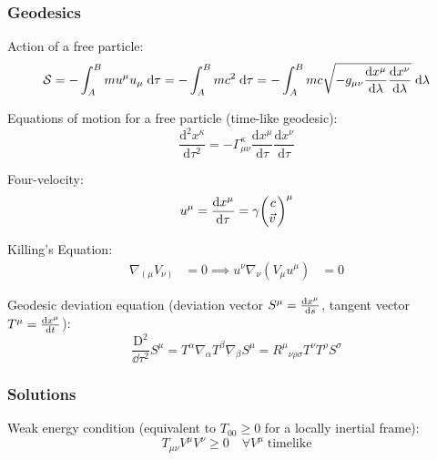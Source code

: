 		\subsubsection{Geodesics}
			\noindent
			Action of a free particle:
			\begin{equation}
				\mathcal{S}
				= -\int_A^B m u^\mu u_\mu \;\dd \tau
				= -\int_A^B mc^2\;\dd \tau
				= -\int_A^B mc\sqrt{-g_{\mu\nu} \dv{x^\mu}{\lambda} \dv{x^\nu}{\lambda}} \;\dd \lambda
			\end{equation}

			\noindent
			Equations of motion for a free particle (time-like geodesic):
			\begin{equation}
				\frac{\mathrm{d}^2 x^\kappa}{\mathrm{d}\tau^2}=-\Gamma_{\mu\nu}^{\kappa}\frac{\mathrm{d}x^\mu}{\mathrm{d}\tau}\frac{\mathrm{d}x^\nu}{\mathrm{d}\tau}
			\end{equation}

			\noindent
			Four-velocity:
			\begin{equation}
				u^\mu = \dv{x^\mu}{\tau} = \gamma \mqty(c \\ \vec{v})^\mu
			\end{equation}

			\noindent
			Killing's Equation:
			\begin{equation}
				\begin{aligned}
					\nabla_{\left(\mu\right.} V_{\left.\nu\right)} &= 0
					\implies u^\nu \nabla_\nu (V_\mu u^\mu) &= 0
				\end{aligned}
			\end{equation}

			\noindent
			Geodesic deviation equation (deviation vector $S^\mu = \dv{x^\mu}{s}$, tangent vector $T^\mu = \dv{x^\mu}{t}$):
			\begin{equation}
				\frac{\mathrm{D}^2}{\dd \tau^2} S^\mu
				= T^\alpha \nabla_\alpha T^\beta \nabla_\beta S^\mu
				= R^\mu{}_{\nu\rho\sigma} T^\nu T^\rho S^\sigma
			\end{equation}


		\subsubsection{Solutions}
			Weak energy condition (equivalent to $T_{00} \ge 0$ for a locally inertial frame):
			\begin{equation}
				\label{Eq:WeakEnergyCondition}
				T_{\mu\nu} V^\mu V^\nu \ge 0 \quad \forall V^\mu\;\text{timelike}
			\end{equation}

